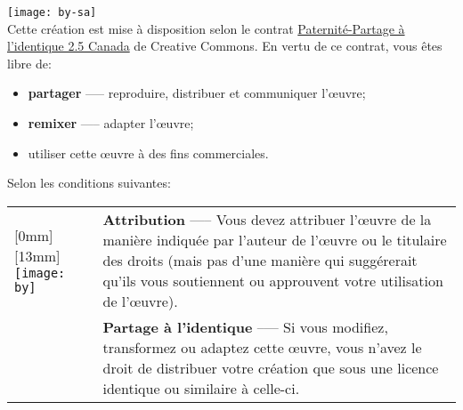 \texttt{[image: by-sa]}\\%
Cette création est mise à disposition selon le contrat
\href{http://creativecommons.org/licenses/by-sa/2.5/ca/}{%
  Paternité-Partage à l'identique 2.5 Canada} de Creative Commons. En
vertu de ce contrat, vous êtes libre de:
\begin{itemize}
\item \textbf{partager} —-- reproduire, distribuer et communiquer
  l'{\oe}uvre;
\item \textbf{remixer} —-- adapter l'{\oe}uvre;
\item utiliser cette {\oe}uvre à des fins commerciales.
\end{itemize}
Selon les conditions suivantes:

\begin{tabularx}{\linewidth}{@{}lX@{}}
  \raisebox{-9mm}[0mm][13mm]{%
    \texttt{[image: by]}} &
  \textbf{Attribution} —-- Vous devez attribuer l'{\oe}uvre de la
  manière indiquée par l'auteur de l'{\oe}uvre ou le titulaire des
  droits (mais pas d'une manière qui suggérerait qu'ils vous
  soutiennent ou
  approuvent votre utilisation de l'{\oe}uvre). \\
  \raisebox{-9mm}{\texttt{[image: sa]}}
  & \textbf{Partage à l'identique} --— Si vous modifiez, transformez
  ou adaptez cette {\oe}uvre, vous n'avez le droit de distribuer votre
  création que sous une licence identique ou similaire à celle-ci.
\end{tabularx}
